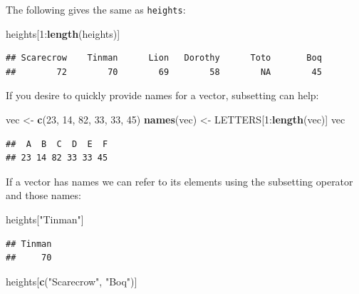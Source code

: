 \documentclass[]{book}
\makeatletter
\newenvironment{Shaded}{\begin{snugshade}}{\end{snugshade}}
\newcommand{\KeywordTok}[1]{\textcolor[rgb]{0.13,0.29,0.53}{\textbf{{#1}}}}
\newcommand{\DecValTok}[1]{\textcolor[rgb]{0.00,0.00,0.81}{{#1}}}
\newcommand{\StringTok}[1]{\textcolor[rgb]{0.31,0.60,0.02}{{#1}}}
\newcommand{\NormalTok}[1]{{#1}}
\newenvironment{kframe}{%
\medskip{}
\setlength{\fboxsep}{.8em}
 \def\at@end@of@kframe{}%
 \ifinner\ifhmode%
  \def\at@end@of@kframe{\end{minipage}}%
  \begin{minipage}{\columnwidth}%
 \fi\fi%
 \def\FrameCommand##1{\hskip\@totalleftmargin \hskip-\fboxsep
 \colorbox{shadecolor}{##1}\hskip-\fboxsep
     \hskip-\linewidth \hskip-\@totalleftmargin \hskip\columnwidth}%
 \MakeFramed {\advance\hsize-\width
   \@totalleftmargin\z@ \linewidth\hsize
   \@setminipage}}%
 {\par\unskip\endMakeFramed%
 \at@end@of@kframe}
\renewenvironment{Shaded}{\begin{kframe}}{\end{kframe}}
\theoremstyle{definition}
\theoremstyle{definition}
\theoremstyle{remark}
\makeatother
\begin{document}
The following gives the same as \texttt{heights}:

\begin{Shaded}
\begin{Highlighting}[]
\NormalTok{heights[}\DecValTok{1}\NormalTok{:}\KeywordTok{length}\NormalTok{(heights)]}
\end{Highlighting}
\end{Shaded}

\begin{verbatim}
## Scarecrow    Tinman      Lion   Dorothy      Toto       Boq 
##        72        70        69        58        NA        45
\end{verbatim}

If you desire to quickly provide names for a vector, subsetting can
help:

\begin{Shaded}
\begin{Highlighting}[]
\NormalTok{vec <-}\StringTok{ }\KeywordTok{c}\NormalTok{(}\DecValTok{23}\NormalTok{, }\DecValTok{14}\NormalTok{, }\DecValTok{82}\NormalTok{, }\DecValTok{33}\NormalTok{, }\DecValTok{33}\NormalTok{, }\DecValTok{45}\NormalTok{)}
\KeywordTok{names}\NormalTok{(vec) <-}\StringTok{ }\NormalTok{LETTERS[}\DecValTok{1}\NormalTok{:}\KeywordTok{length}\NormalTok{(vec)]}
\NormalTok{vec}
\end{Highlighting}
\end{Shaded}

\begin{verbatim}
##  A  B  C  D  E  F 
## 23 14 82 33 33 45
\end{verbatim}

If a vector has names we can refer to its elements using the subsetting
operator and those names:

\begin{Shaded}
\begin{Highlighting}[]
\NormalTok{heights[}\StringTok{"Tinman"}\NormalTok{]}
\end{Highlighting}
\end{Shaded}

\begin{verbatim}
## Tinman 
##     70
\end{verbatim}

\begin{Shaded}
\begin{Highlighting}[]
\NormalTok{heights[}\KeywordTok{c}\NormalTok{(}\StringTok{"Scarecrow"}\NormalTok{, }\StringTok{"Boq"}\NormalTok{)]}
\end{Highlighting}
\end{Shaded}
\end{document}
